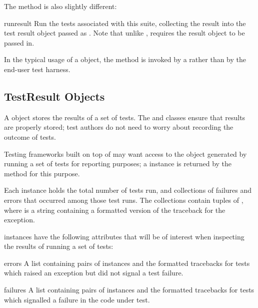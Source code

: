 The  method is also slightly different:

\begin{methoddesc}[TestSuite]{run}{result}
  Run the tests associated with this suite, collecting the result into
  the test result object passed as .  Note that unlike
  ,  requires the
  result object to be passed in.
\end{methoddesc}

In the typical usage of a  object, the 
method is invoked by a  rather than by the end-user
test harness.


\subsection{TestResult Objects
            \label{testresult-objects}}

A  object stores the results of a set of tests.  The
 and  classes ensure that results are
properly stored; test authors do not need to worry about recording the
outcome of tests.

Testing frameworks built on top of  may want
access to the  object generated by running a set of
tests for reporting purposes; a  instance is
returned by the  method for this purpose.

Each instance holds the total number of tests run, and collections of
failures and errors that occurred among those test runs.  The
collections contain tuples of , where  is a string containing a
formatted version of the traceback for the exception.

 instances have the following attributes that will
be of interest when inspecting the results of running a set of tests:

\begin{memberdesc}[TestResult]{errors}
  A list containing pairs of  instances and the
  formatted tracebacks for tests which raised an exception but did not
  signal a test failure.
\end{memberdesc}

\begin{memberdesc}[TestResult]{failures}
  A list containing pairs of  instances and the
  formatted tracebacks for tests which signalled a failure in the code
  under test.
\end{memberdesc}

